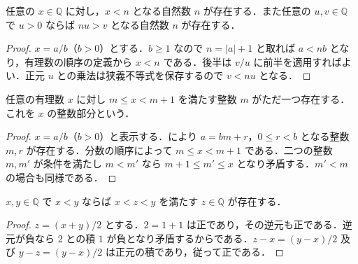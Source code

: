\begin{prop}[有理数体のArchimedes性]
任意の $x\in\mathbb Q$ に対し，$x<n$ となる自然数 $n$ が存在する．また任意の $u,v\in\mathbb Q$ で $u>0$ ならば $nu>v$ となる自然数 $n$ が存在する．
\end{prop}
\begin{proof}
$x=a/b$（$b>0$）とする．$b\geq1$ なので $n=|a|+1$ と取れば $a<nb$ となり，有理数の順序の定義から $x<n$ である．後半は $v/u$ に前半を適用すればよい．正元 $u$ との乗法は狭義不等式を保存するので $v<nu$ となる．
\end{proof}
\begin{prop}[有理数の整数部分]
任意の有理数 $x$ に対し $m\leq x<m+1$ を満たす整数 $m$ がただ一つ存在する．これを $x$ の整数部分という．
\end{prop}
\begin{proof}
$x=a/b$（$b>0$）と表示する．により $a=bm+r$，$0\leq r<b$ となる整数 $m,r$ が存在する．分数の順序によって $m\leq x<m+1$ である．二つの整数 $m,m'$ が条件を満たし $m<m'$ なら $m+1\leq m'\leq x$ となり矛盾する．$m'<m$ の場合も同様である．
\end{proof}
\begin{prop}[有理数の順序の稠密性]
$x,y\in\mathbb Q$ で $x<y$ ならば $x<z<y$ を満たす $z\in\mathbb Q$ が存在する．
\end{prop}
\begin{proof}
$z=(x+y)/2$ とする．$2=1+1$ は正であり，その逆元も正である．逆元が負なら $2$ との積 $1$ が負となり矛盾するからである．$z-x=(y-x)/2$ 及び $y-z=(y-x)/2$ は正元の積であり，従って正である．
\end{proof}
